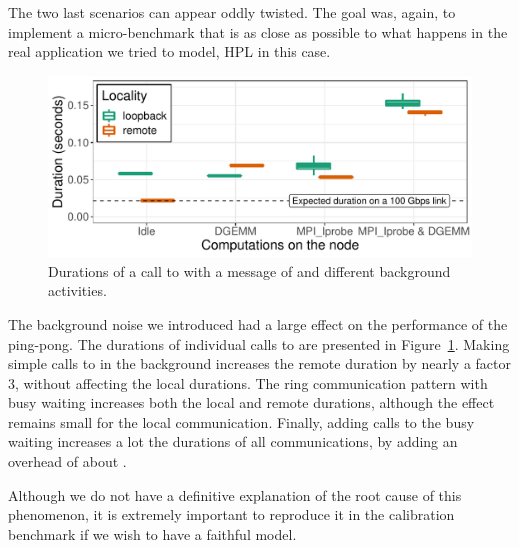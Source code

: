         The two last scenarios can appear oddly twisted. The goal was, again, to implement a micro-benchmark that is as
        close as possible to what happens in the real application we tried to model, HPL in this case.

        \begin{figure}[htpb]
            \centering
            \includegraphics[width=1\linewidth]{img/experiment/experimental_conditions/communication_computation_interference.pdf}
            \caption{Durations of a call to \recv with a message of  and different background
            activities.}%
            \label{fig:experiment:experimental_conditions}
        \end{figure}

        The background noise we introduced had a large effect on the performance of the ping-pong. The durations of
        individual calls to \recv are presented in Figure~\ref{fig:experiment:experimental_conditions}. Making simple
        calls to \dgemm in the background increases the remote duration by nearly a factor \(3\), without affecting the
        local durations. The ring communication pattern with \iprobe busy waiting increases both the local
        and remote durations, although the effect remains small for the local communication. Finally, adding \dgemm
        calls to the busy waiting increases a lot the durations of all communications, by adding an overhead of about
        .

        Although we do not have a definitive explanation of the root cause of this phenomenon, it is extremely important
        to reproduce it in the calibration benchmark if we wish to have a faithful model.

